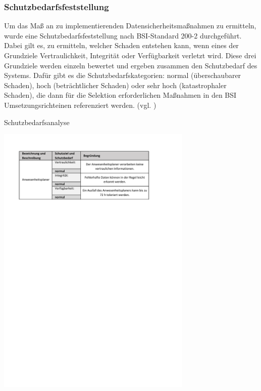\subsubsection{Schutzbedarfsfeststellung}
\label{sec:Schutzbedarfsfeststellung}
Um das Maß an zu implementierenden Datensicherheitsmaßnahmen zu ermitteln, wurde eine Schutzbedarfsfeststellung nach BSI-Standard 200-2 durchgeführt. Dabei gilt es, zu ermitteln, welcher Schaden entstehen kann, wenn eines der Grundziele Vertraulichkeit, Integrität oder Verfügbarkeit verletzt wird. Diese drei Grundziele werden einzeln bewertet und ergeben zusammen den Schutzbedarf des Systems. Dafür gibt es die Schutzbedarfskategorien: normal (überschaubarer Schaden), hoch (beträchtlicher Schaden) oder sehr hoch (katastrophaler Schaden), die dann für die Selektion erforderlichen Maßnahmen in den BSI Umsetzungsrichteinen referenziert werden. (vgl. \cite[S.104 - 109]{BSI200-2})

\begin{table}[htbp]
    \centering
    \caption[Schutzbedarfsanalyse]{Schutzbedarfsanalyse}
    \includegraphics[width=0.7\textwidth,angle=0]{abb/Schutzbedarfsanalyse.pdf}
    \label{abb:Schutzbedarfsanalyse}
\end{table}

